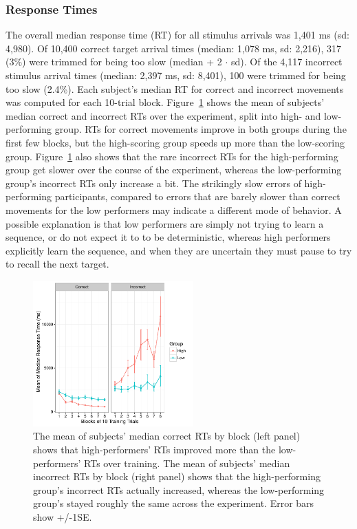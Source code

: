 \documentclass[man,floatsintext]{apa6}
\begin{document}
\subsubsection{Response Times}

The overall median response time (RT) for all stimulus arrivals was 1,401 ms (sd: 4,980). Of 10,400 correct target arrival times (median: 1,078 ms, sd: 2,216), 317 (3\%) were trimmed for being too slow (median + 2 $\cdot$ sd). Of the 4,117 incorrect stimulus arrival times (median: 2,397 ms, sd: 8,401), 100 were trimmed for being too slow (2.4\%). Each subject's median RT for correct and incorrect movements was computed for each 10-trial block. Figure~\ref{fig:basic-hitRT} shows the mean of subjects' median correct and incorrect RTs over the experiment, split into high- and low-performing group. RTs for correct movements improve in both groups during the first few blocks, but the high-scoring group speeds up more than the low-scoring group. Figure~\ref{fig:basic-hitRT} also shows that the rare incorrect RTs for the high-performing group get slower over the course of the experiment, whereas the low-performing group's incorrect RTs only increase a bit. The strikingly slow errors of high-performing participants, compared to errors that are barely slower than correct movements for the low performers may indicate a different mode of behavior. A possible explanation is that low performers are simply not trying to learn a sequence, or do not expect it to to be deterministic, whereas high performers explicitly learn the sequence, and when they are uncertain they must pause to try to recall the next target. 

\begin{figure}[h]
  \centering
  \includegraphics[width=0.55\textwidth]{figures/RL_RT_over_time_by_medSplit_n_correct}
  \caption{The mean of subjects' median correct RTs by block (left panel) shows that high-performers' RTs improved more than the low-performers' RTs over training. The mean of subjects' median incorrect RTs by block (right panel) shows that the high-performing group's incorrect RTs actually increased, whereas the low-performing group's stayed roughly the same across the experiment. Error bars show +/-1SE.}
  \label{fig:basic-hitRT}
\end{figure}
\end{document}
